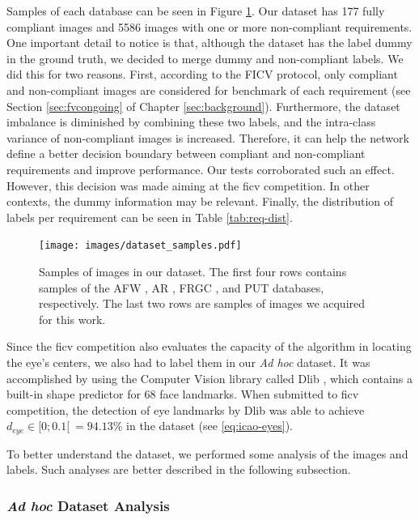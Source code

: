 Samples of each database can be seen in Figure \ref{fig:dataset_samples}. Our dataset has 177 fully compliant images and 5586 images with one or more non-compliant requirements. One important detail to notice is that, although the \adhoc dataset has the label dummy in the ground truth, we decided to merge dummy and non-compliant labels. We did this for two reasons. First, according to the FICV protocol, only compliant and non-compliant images are considered for benchmark of each requirement (see Section \ref{sec:fvcongoing} of Chapter \ref{sec:background}). Furthermore, the dataset imbalance is diminished by combining these two labels, and the intra-class variance of non-compliant images is increased. Therefore, it can help the network define a better decision boundary between compliant and non-compliant requirements and improve performance. Our tests corroborated such an effect. However, this decision was made aiming at the \acs{ficv} competition. In other contexts, the dummy information may be relevant. Finally, the distribution of labels per requirement can be seen in Table \ref{tab:req-dist}. 

\begin{figure}[ht]
\centering
\texttt{[image: images/dataset\_samples.pdf]}
\caption{Samples of images in our dataset. The first four rows contains samples of the AFW \citep{databaseAFW}, AR \citep{martinez1998ar}, FRGC \citep{databaseFRGC}, and PUT \citep{kasinski2008put} databases, respectively. The last two rows are samples of images we acquired for this work.}
\label{fig:dataset_samples}
\end{figure}



Since the \acs{ficv} competition also evaluates the capacity of the algorithm in locating the eye's centers, we also had to label them in our \textit{Ad hoc} dataset. It was accomplished by using the Computer Vision library called Dlib \citep{dlib}, which contains a built-in shape predictor for 68 face landmarks. When submitted to \acs{ficv} competition, the detection of eye landmarks by Dlib was able to achieve $d_{eye} \in [0;0.1[\ = 94.13\%$ in the \ficvtest dataset (see \autoref{eq:icao-eyes}).

To better understand the \adhoc dataset, we performed some analysis of the images and labels. Such analyses are better described in the following subsection.

\subsubsection{\textit{Ad hoc} Dataset Analysis}

